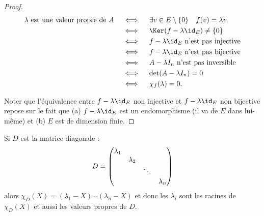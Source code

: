 \documentclass[12pt, class=report,crop=false]{standalone}
\begin{document}
\begin{proof}


\begin{align*}
\lambda \text{ est une valeur propre de } A
&\quad\iff\quad \exists v \in E\setminus\{0\} \quad  f(v) = \lambda v \\
&\quad\iff\quad \Ker(f-\lambda \id_E) \neq \{0\} \\
&\quad\iff\quad f-\lambda\id_E \text{ n'est pas injective} \\
&\quad\iff\quad f-\lambda\id_E \text{ n'est pas bijective} \\
&\quad\iff\quad A-\lambda I_n \text{ n'est pas inversible} \\
&\quad\iff\quad \det (A-\lambda I_n) = 0 \\
&\quad\iff\quad \chi_f(\lambda) = 0.
\end{align*}

Noter que l'équivalence entre \og{}$f-\lambda\id_E$ non injective\fg{}
et \og{}$f-\lambda\id_E$ non bijective\fg{} repose sur le fait que
(a) $f-\lambda\id_E$ est un endomorphisme (il va de $E$ dans lui-même)
et (b) $E$ est de dimension finie.
\end{proof}



\begin{exemple}
Si $D$ est la matrice diagonale :
$$D = \begin{pmatrix}
\lambda_{1}&&& \cr
&\lambda_{2}&&\cr
&& \ddots &\cr
&&& \lambda_{n} \cr
\end{pmatrix}$$ 
alors $\chi_D(X) = (\lambda_1-X)\cdots(\lambda_n-X)$ et donc les $\lambda_i$ sont les racines de $\chi_D(X)$ et aussi
les valeurs propres de $D$.
\end{exemple}
\end{document}
